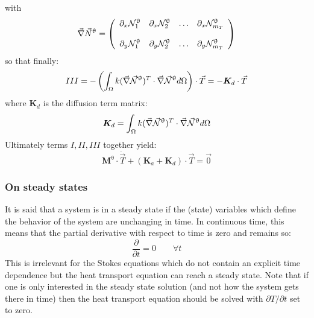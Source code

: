 with 
\[
\vec \nabla \vec N^\uptheta = 
\left(
\begin{array}{cccc}
\partial_x {\mathcal{N}}_1^\uptheta & 
\partial_x {\mathcal{N}}_2^\uptheta & \dots &
\partial_x {\mathcal{N}}_{m_T}^\uptheta \\ \\
\partial_y {\mathcal{N}}_1^\uptheta & 
\partial_y {\mathcal{N}}_2^\uptheta & \dots &
\partial_y {\mathcal{N}}_{m_T}^\uptheta 
\end{array}
\right)
\]
so that finally:
\[
III = - \left( \int_\Omega k (\vec \nabla \vec {{\mathcal{N}}}^\uptheta)^T \cdot 
\vec \nabla \vec {{\mathcal{N}}}^\uptheta d\Omega \right) \cdot \vec T
= - {\bm K}_d \cdot \vec T
\]
where ${\bm K}_d$ is the diffusion term matrix:
\[
{\bm K}_d = \int_\Omega  k (\vec \nabla \vec {{\mathcal{N}}}^\uptheta)^T \cdot \vec \nabla \vec {{\mathcal{N}}}^\uptheta d\Omega 
\]
 Ultimately terms $I,II,III$ together yield:
\[
\boxed{
{\bm M}^\uptheta \cdot \dot{\vec T} + ({\bm K}_a + {\bm K}_d) \cdot \vec T = \vec 0
}
\]



\subsubsection{On steady states}

It is said that a system is in a steady state if the (state) variables which define the behavior of the system 
are unchanging in time. In continuous time, this means that the partial derivative with respect to time is zero and remains so:
\[
\frac{\partial}{\partial t} =0 \qquad \forall t
\]
This is irrelevant for the Stokes equations which do not contain an explicit time dependence but the heat 
transport equation can reach a steady state. 
Note that if one is only interested in the steady state solution (and not how the system gets there in time)
then the heat transport equation should be solved with $\partial T/\partial t$ set to zero. 





